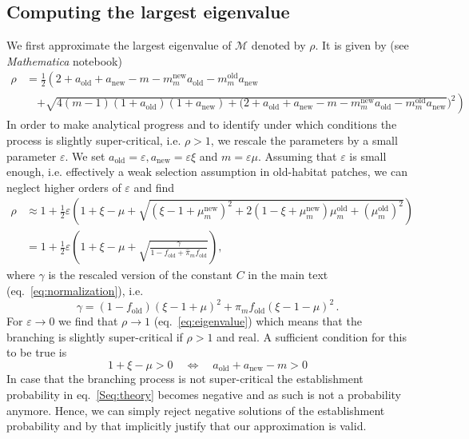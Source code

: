 \documentclass[a4paper,11pt]{scrartcl}
\newcommand{\chg}[1]{\textcolor{change}{#1}}
\begin{document}
\subsection*{Computing the largest eigenvalue}
We first approximate the largest eigenvalue of $\mathcal{M}$ denoted by $\rho$. It is given by (see \textit{Mathematica} notebook)
\begin{equation}
\begin{aligned}
    \rho &= \frac{1}{2}\left(2 + a_{\text{old}} + a_{\text{new}} - m -  m_m^{\text{new}} a_{\text{old}} - m_m^{\text{old}} a_{\text{new}} \right.\\
    &\quad \left. + \sqrt{4 (m -1) (1+a_{\text{old}})(1+a_{\text{new}}) + (2+a_{\text{old}} + a_{\text{new}} - m - m_m^{\text{new}} a_{\text{old}} - m_m^{\text{old}} a_{\text{new}}})^2 \right)
\end{aligned}
\end{equation}
%
In order to make analytical progress and to identify under which conditions the process is slightly super-critical, i.e. $\rho>1$, we rescale the parameters by a small parameter $\varepsilon$. We set $a_{\text{old}} = \varepsilon, a_{\text{new}} = \varepsilon \xi$ and $m = \varepsilon\mu$. Assuming that $\varepsilon$ is small enough, i.e. effectively a weak selection assumption in old-habitat patches, we can neglect higher orders of $\varepsilon$ and find
\begin{equation}\label{eq:eigenvalue}
\begin{aligned}
    \rho &\approx 1+\frac{1}{2}\varepsilon\left(1+ \xi - \mu + \sqrt{(\xi -1 + \mu_m^{\text{new}})^2 + 2(1-\xi+\mu_m^{\text{new}})\mu_m^{\text{old}} + (\mu_m^{\text{old}})^2  }\right)\\
    &= 1+\frac{1}{2}\varepsilon\left(1+ \xi - \mu + \sqrt{\frac{\gamma}{1-f_{\text{old}}+\widehat{\pi}_m f_{\text{old}}}  }\right),
\end{aligned}
\end{equation}
where $\gamma$ is the rescaled version of the constant $C$ in the main text (eq.~\eqref{eq:normalization}), i.e.
\begin{equation}
    \gamma = (1-f_{\text{old}})(\xi-1+\mu)^2 + \widehat{\pi}_m f_{\text{old}} (\xi-1-\mu)^2\, .
\end{equation}
%
For $\varepsilon\to 0$ we find that $\rho\to 1$ \chg{(eq.~\eqref{eq:eigenvalue}) which means that the branching is slightly super-critical if $\rho>1$ and real. A sufficient condition for this to be true is}
\begin{equation}
    1+\xi-\mu > 0 \quad \Leftrightarrow \quad a_{\text{old}} + a_{\text{new}} - m > 0
\end{equation}
%
\chg{In case that the branching process is not super-critical the establishment probability in eq.~\eqref{Seq:theory} becomes negative and as such is not a probability anymore. Hence, we can simply reject negative solutions of the establishment probability and by that implicitly justify that our approximation is valid.}%
\end{document}
